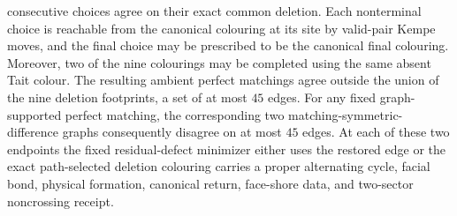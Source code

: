 \begin{corollary}
consecutive choices agree on their exact common deletion.  Each nonterminal
choice is reachable from the canonical colouring at its site by valid-pair
Kempe moves, and the final choice may be prescribed to be the canonical final
colouring.  Moreover, two of the nine colourings may be completed using the
same absent Tait colour.  The resulting ambient perfect matchings agree outside
the union of the nine deletion footprints, a set of at most $45$ edges.  For
any fixed graph-supported perfect matching, the corresponding two
matching-symmetric-difference graphs consequently disagree on at most $45$
edges.  At each of these two endpoints the fixed residual-defect minimizer
either uses the restored edge or the exact path-selected deletion colouring
carries a proper alternating cycle, facial bond, physical formation,
canonical return, face-shore data, and two-sector noncrossing receipt.
\end{corollary}

